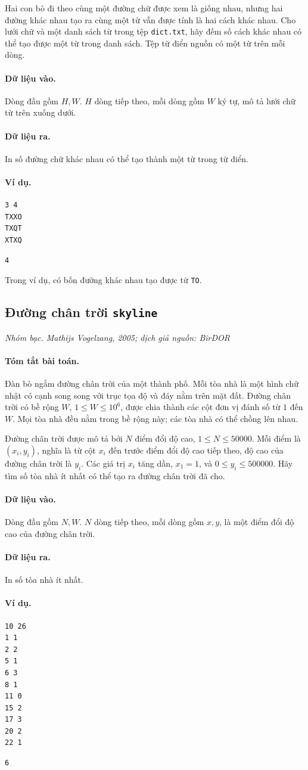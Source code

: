 \documentclass[11pt]{article}
\newcommand{\problem}[4]{%
  \subsection[#1 (#2)]{#1 \hfill {\normalsize\texttt{#2}}}%
  \noindent\textit{#3. #4}\par\smallskip
}
\newcommand{\iosec}[1]{\paragraph{#1}}
\begin{document}
Hai con bò đi theo cùng một đường chữ được xem là giống nhau, nhưng hai đường
khác nhau tạo ra cùng một từ vẫn được tính là hai cách khác nhau. Cho lưới chữ
và một danh sách từ trong tệp \texttt{dict.txt}, hãy đếm số cách khác nhau có
thể tạo được một từ trong danh sách. Tệp từ điển nguồn có một từ trên mỗi
dòng.

\iosec{Dữ liệu vào.}
Dòng đầu gồm \(H,W\). \(H\) dòng tiếp theo, mỗi dòng gồm \(W\) ký tự, mô tả
lưới chữ từ trên xuống dưới.

\iosec{Dữ liệu ra.}
In số đường chữ khác nhau có thể tạo thành một từ trong từ điển.

\iosec{Ví dụ.}
\begin{verbatim}
3 4
TXXO
TXQT
XTXQ
\end{verbatim}

\begin{verbatim}
4
\end{verbatim}

Trong ví dụ, có bốn đường khác nhau tạo được từ \texttt{TO}.

\problem{Đường chân trời}{skyline}{Nhóm bạc}{Mathijs Vogelzang, 2005; dịch giả nguồn: BirDOR}

\iosec{Tóm tắt bài toán.}
Đàn bò ngắm đường chân trời của một thành phố. Mỗi tòa nhà là một hình chữ
nhật có cạnh song song với trục tọa độ và đáy nằm trên mặt đất. Đường chân
trời có bề rộng \(W\), \(1\le W\le 10^6\), được chia thành các cột đơn vị
đánh số từ \(1\) đến \(W\). Mọi tòa nhà đều nằm trong bề rộng này; các tòa nhà
có thể chồng lên nhau.

Đường chân trời được mô tả bởi \(N\) điểm đổi độ cao,
\(1\le N\le 50000\). Mỗi điểm là \((x_i,y_i)\), nghĩa là từ cột \(x_i\) đến
trước điểm đổi độ cao tiếp theo, độ cao của đường chân trời là \(y_i\). Các
giá trị \(x_i\) tăng dần, \(x_1=1\), và \(0\le y_i\le 500000\). Hãy tìm số
tòa nhà ít nhất có thể tạo ra đường chân trời đã cho.

\iosec{Dữ liệu vào.}
Dòng đầu gồm \(N,W\). \(N\) dòng tiếp theo, mỗi dòng gồm \(x,y\), là một điểm
đổi độ cao của đường chân trời.

\iosec{Dữ liệu ra.}
In số tòa nhà ít nhất.

\iosec{Ví dụ.}
\begin{verbatim}
10 26
1 1
2 2
5 1
6 3
8 1
11 0
15 2
17 3
20 2
22 1
\end{verbatim}

\begin{verbatim}
6
\end{verbatim}
\end{document}
